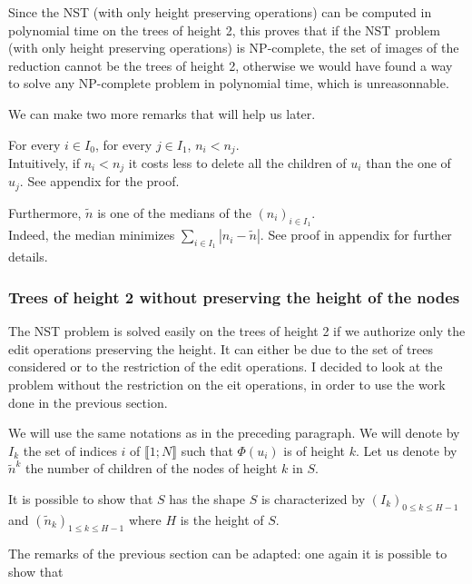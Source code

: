 Since the NST (with only height preserving operations) can be computed
in polynomial time on the trees of height 2, this proves that if the
NST problem (with only height preserving operations) is NP-complete,
the set of images of the reduction cannot be the trees of height 2,
otherwise we would have found a way to solve any NP-complete problem
in polynomial time, which is unreasonnable.

We can make two more remarks that will help us later. 

\begin{remark} 
  For every $i \in I_{0}$, for
  every $j \in I_{1}$, $n_{i} < n_{j}$.\\
  Intuitively, if $n_{i} < n_{j}$ it costs less to delete all the
  children of $u_{i}$ than the one of $u_{j}$. See appendix for the proof.
\end{remark}

\begin{remark}
  Furthermore, $\tilde{n}$ is one of the medians of the
  $(n_{i})_{i \in I_{1}}$. \\
  Indeed, the median minimizes
  $\sum_{i \in I_{1}} \left| n_{i} - \tilde{n} \right|$. See proof in
  appendix for further details.
\end{remark}

\subsubsection{Trees of height 2 without preserving the height of the
  nodes}

The NST problem is solved easily on the trees of height 2 if we
authorize only the edit operations preserving the height. It can
either be due to the set of trees considered or to the restriction of
the edit operations. I decided to look at the problem without the
restriction on the eit operations, in order to use the work done in
the previous section. 

We will use the same notations as in the preceding paragraph. We will
denote by $I_{k}$ the set of indices $i$ of $\llbracket 1;N \rrbracket$
such that $\Phi(u_{i})$ is of height $k$. Let us denote by
$\tilde{n}^{k}$ the number of children of the nodes of height $k$ in
$S$.

It is possible to show that $S$ has the shape %
$S$ is characterized by $(I_{k})_{0 \leqslant k \leqslant H-1}$ and
$(\tilde{n}_{k})_{1 \leqslant k \leqslant H-1}$ where $H$ is the
height of $S$.

The remarks of the previous section can be adapted: one again it is
possible to show that 

